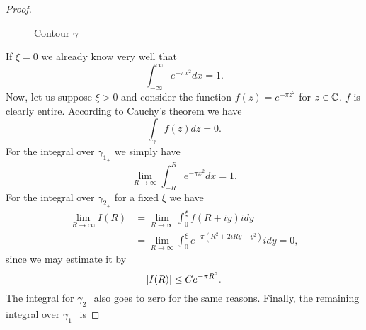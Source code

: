 \begin{proof}
\begin{figure}[!htb]
\begin{minipage}[c]{0.5\textwidth}
\end{minipage}
\caption{Contour $\gamma$}
\label{fig:ContourC}
\end{figure}
	If $\xi = 0$ we already know very well that
\begin{equation*}
	\int _{-\infty} ^\infty e^{-\pi x^2} dx = 1.
\end{equation*}
	Now, let us suppose $\xi > 0$ and consider the function $f(z) = e^{-\pi z^2}$ for $z \in \mathbb{C}$. $f$ is clearly entire. According to Cauchy's theorem we have
\begin{equation*}
	\int _{\gamma} f(z) dz = 0.
\end{equation*}
	For the integral over $\gamma_{1_+}$ we simply have
\begin{equation*}
	\lim _{R \to \infty} \int _{-R} ^R e^{-\pi x^2} dx = 1.
\end{equation*}
	For the integral over $\gamma_{2_+}$ for a fixed $\xi$ we have
\begin{equation*}
\begin{aligned}	
	\lim _{R \to \infty} I(R) 
	&= \lim _{R \to \infty} \int _0 ^\xi f(R + i y) i dy \\
	&= \lim _{R \to \infty} \int _0 ^\xi e^{-\pi (R^2 + 2iRy - y^2)} i dy = 0,
\end{aligned}
\end{equation*}
	since we may estimate it by
\begin{equation*}
	\left|I(R)\right| \leq Ce^{-\pi R^2}.
\end{equation*}
	The integral for $\gamma_{2_-}$ also goes to zero for the same reasons. Finally, the remaining integral over $\gamma_{1_-}$ is

\end{proof}
